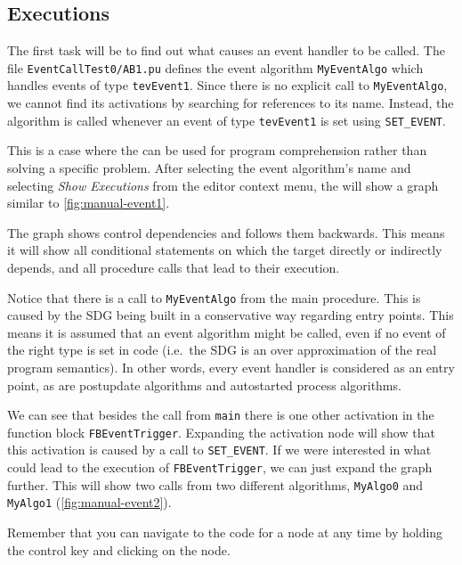 \subsection*{Executions}

The first task will be to find out what causes an event handler to be called. The file \texttt{EventCallTest0/AB1.pu} 
defines the event algorithm \lstinline|MyEventAlgo| which handles events of type \lstinline|tevEvent1|. Since there is 
no explicit call to \lstinline|MyEventAlgo|, we cannot find its activations by searching for references to its name. 
Instead, the algorithm is called whenever an event of type \lstinline|tevEvent1| is set using \lstinline|SET_EVENT|.

This is a case where the \SB can be used for program comprehension rather than solving a specific problem. After 
selecting the event algorithm's name and selecting \emph{Show Executions} from the editor context menu, the \SB will 
show a graph similar to \autoref{fig:manual-event1}.

The graph shows control dependencies and follows them backwards. This means it will show all conditional statements on 
which the target directly or indirectly depends, and all procedure calls that lead to their execution.

Notice that there is a call to \lstinline|MyEventAlgo| from the main procedure. This is caused by the SDG being built 
in a conservative way regarding entry points. This means it is assumed that an event algorithm might be called, even if 
no event of the right type is set in code (i.e.\ the SDG is an over approximation of the real program semantics). In 
other words, every event handler is considered as an entry point, as are postupdate algorithms and autostarted process 
algorithms.

We can see that besides the call from \lstinline|main| there is one other activation in the function block 
\lstinline|FBEventTrigger|. Expanding the activation node will show that this activation is caused by a call to 
\lstinline|SET_EVENT|. If we were interested in what could lead to the execution of \lstinline|FBEventTrigger|, we can 
just expand the graph further. This will show two calls from two different algorithms, \lstinline|MyAlgo0| and 
\lstinline|MyAlgo1| (\autoref{fig:manual-event2}).

Remember that you can navigate to the code for a node at any time by holding the control key and clicking on the node.

